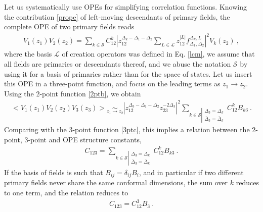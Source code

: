 \documentclass[12pt, a4paper]{article}
\theoremstyle{break}
\begin{document}
Let us systematically use OPEs for simplifying correlation functions. Knowing the contribution \eqref{prope} of left-moving descendants of primary fields, the complete OPE of two primary fields reads 
\begin{align}
 V_1(z_1)V_2(z_2) = \sum_{k\in\mathcal{S}} C_{12}^k \left|z_{12}^{\Delta_k-\Delta_1-\Delta_2}\sum_{L\in\mathcal{L}} z_{12}^{|L|}f_{\Delta_1,\Delta_2}^{\Delta_k,L}\right|^2 V_k(z_2)\ ,
 \label{tope}
\end{align}
where the basis $\mathcal{L}$ of creation operators was defined in Eq. \eqref{lcm},
we assume that all fields are primaries or descendants thereof, and we abuse the notation $\mathcal{S}$ by using it for a basis of primaries rather than for the space of states. Let us insert this OPE in a three-point function, and focus on the leading terms as $z_1\to z_2$. Using the 2-point function \eqref{2ptb}, we obtain
\begin{align}
  \Big< V_1(z_1)V_2(z_2)V_3(z_3) \Big> \underset{z_1\to z_2}{\sim} 
  \left|z_{12}^{\Delta_3-\Delta_1-\Delta_2}z_{23}^{-2\Delta_3}\right|^2 
  \sum_{k\in\mathcal{S}\left|\substack{\Delta_3=\Delta_k\\ \bar{\Delta}_3=\bar\Delta_k}\right. }
  C_{12}^k B_{k3}\ .
\end{align}
Comparing with the 3-point function \eqref{3ptc}, this implies a relation between the 2-point, 3-point and OPE structure constants, 
\begin{align}
 C_{123} = \sum_{k\in\mathcal{S}\left|\substack{\Delta_3=\Delta_k\\ \bar{\Delta}_3=\bar\Delta_k}\right. } C_{12}^k B_{k3}\ .
\end{align}
If the basis of fields is such that $B_{ij}=\delta_{ij}B_i$, and in particular if two different primary fields never share the same conformal dimensions, the sum over $k$ reduces to one term, and the relation reduces to
\begin{align}
 \boxed{C_{123} = C_{12}^3B_{3}} \ .
 \label{ccb}
\end{align}
\end{document}
